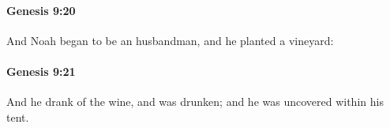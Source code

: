 		\paragraph{Genesis 9:20} %
			\label{GENESIS-9-20}

			And Noah began to be an husbandman, and he planted a vineyard:


		\paragraph{Genesis 9:21} %
			\label{GENESIS-9-21}

			And he drank of the wine, and was drunken; and he was uncovered within his tent.


